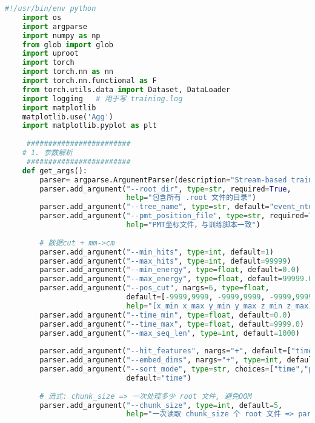 \begin{lstlisting}[language=Python, caption={模型训练、验证与测试对比脚本 (train\_val\_test\_compare\_v1.py)}, label={lst:train_script}]
    #!/usr/bin/env python
    import os
    import argparse
    import numpy as np
    from glob import glob
    import uproot
    import torch
    import torch.nn as nn
    import torch.nn.functional as F
    from torch.utils.data import Dataset, DataLoader
    import logging   # 用于写 training.log
    import matplotlib
    matplotlib.use('Agg')
    import matplotlib.pyplot as plt
    
     ########################
    # 1. 参数解析
     ########################
    def get_args():
        parser= argparse.ArgumentParser(description="Stream-based training + val + test + SF vs DL compare.")
        parser.add_argument("--root_dir", type=str, required=True,
                            help="包含所有 .root 文件的目录")
        parser.add_argument("--tree_name", type=str, default="event_ntuple")
        parser.add_argument("--pmt_position_file", type=str, required=True,
                            help="PMT坐标文件，与训练脚本一致")
    
        # 数据cut + mm->cm
        parser.add_argument("--min_hits", type=int, default=1)
        parser.add_argument("--max_hits", type=int, default=99999)
        parser.add_argument("--min_energy", type=float, default=0.0)
        parser.add_argument("--max_energy", type=float, default=99999.0)
        parser.add_argument("--pos_cut", nargs=6, type=float, 
                            default=[-9999,9999, -9999,9999, -9999,9999],
                            help="[x_min x_max y_min y_max z_min z_max], mm")
        parser.add_argument("--time_min", type=float, default=0.0)
        parser.add_argument("--time_max", type=float, default=9999.0)
        parser.add_argument("--max_seq_len", type=int, default=1000)
    
        parser.add_argument("--hit_features", nargs="+", default=["time","x","y","z"])
        parser.add_argument("--embed_dims", nargs="+", type=int, default=[8,8,8,8])
        parser.add_argument("--sort_mode", type=str, choices=["time","pmt_id"], 
                            default="time")
    
        # 流式: chunk_size => 一次处理多少 root 文件, 避免OOM
        parser.add_argument("--chunk_size", type=int, default=5,
                            help="一次读取 chunk_size 个 root 文件 => parse events => random split train/val/test => train => accumulate test?")
    

\end{lstlisting}
